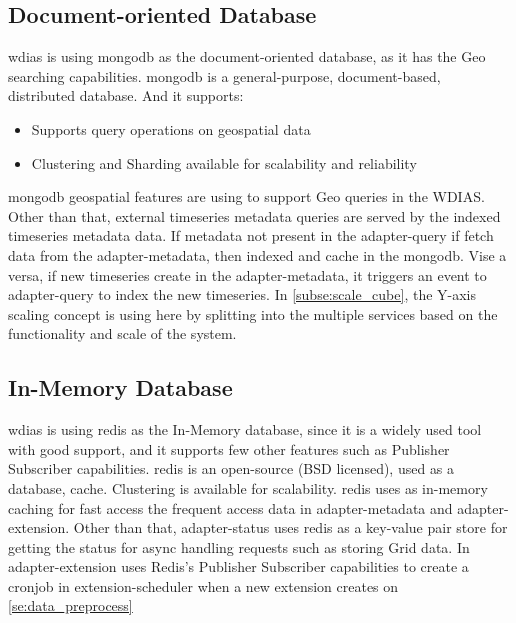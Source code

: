 \subsection{Document-oriented Database}
\label{subse:mongodb}

\acrshort{wdias} is using \acrshort{mongodb} as the document-oriented database, as it has the Geo searching capabilities.
\acrshort{mongodb} \cite{mongodbMongoDBManual} is a general-purpose, document-based, distributed database. And it supports:
\begin{itemize}
  \item Supports query operations on geospatial data \cite{mongodbMongoDBManual}
  \item Clustering and Sharding available for scalability and reliability
\end{itemize}
\acrshort{mongodb} geospatial features are using to support Geo queries in the WDIAS. Other than that, external timeseries metadata queries are served by the indexed timeseries metadata data.
If metadata not present in the adapter-query if fetch data from the adapter-metadata, then indexed and cache in the \acrshort{mongodb}. Vise a versa, if new timeseries create in the adapter-metadata, it triggers an event to adapter-query to index the new timeseries.
In \cref{subse:scale_cube}, the Y-axis scaling concept is using here by splitting into the multiple services based on the functionality and scale of the system.

\subsection{In-Memory Database}
\label{subse:redis}
\acrshort{wdias} is using \acrshort{redis} \cite{redisRedisDocumentation} as the In-Memory database, since it is a widely used tool with good support, and it supports few other features such as Publisher Subscriber capabilities.
\acrshort{redis} is an open-source (BSD licensed), used as a database, cache. Clustering is available for scalability.
\acrshort{redis} uses as in-memory caching for fast access the frequent access data in adapter-metadata and adapter-extension.
Other than that, adapter-status uses \acrshort{redis} as a key-value pair store for getting the status for async handling requests such as storing Grid data.
In adapter-extension uses Redis's Publisher Subscriber capabilities to create a cronjob in extension-scheduler when a new extension creates on \cref{se:data_preprocess}
